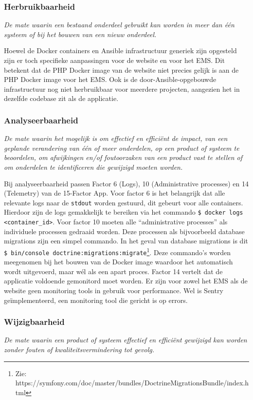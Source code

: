 \subsubsection{Herbruikbaarheid}
\textit{De mate waarin een bestaand onderdeel gebruikt kan worden in meer dan één systeem of bij het bouwen van een nieuw onderdeel.}

Hoewel de Docker containers en Ansible infrastructuur generiek zijn opgesteld zijn er toch specifieke aanpassingen voor de website en voor het EMS. Dit betekent dat de PHP Docker image van de website niet precies gelijk is aan de PHP Docker image voor het EMS. Ook is de door-Ansible-opgebouwde infrastructuur nog niet herbruikbaar voor meerdere projecten, aangezien het in dezelfde codebase zit als de applicatie.

\subsubsection{Analyseerbaarheid}
\textit{De mate waarin het mogelijk is om effectief en efficiënt de impact, van een geplande verandering van één of meer onderdelen, op een product of systeem te beoordelen, om afwijkingen en/of foutoorzaken van een product vast te stellen of om onderdelen te identificeren die gewijzigd moeten worden.}

Bij analyseerbaarheid passen Factor 6 (Logs), 10 (Administrative processes) en 14 (Telemetry) van de 15-Factor App. Voor factor 6 is het belangrijk dat alle relevante logs naar de \texttt{stdout} worden gestuurd, dit gebeurt voor alle containers. Hierdoor zijn de logs gemakkelijk te bereiken via het commando \texttt{\$ docker logs <container\_id>}. Voor factor 10 moeten alle \enquote{administrative processes} als individuele processen gedraaid worden. Deze processen als bijvoorbeeld database migrations zijn een simpel commando. In het geval van database migrations is dit \texttt{\$ bin/console doctrine:migrations:migrate}\footnote{Zie: https://symfony.com/doc/master/bundles/DoctrineMigrationsBundle/index.html}. Deze commando's worden meegenomen bij het bouwen van de Docker image waardoor het automatisch wordt uitgevoerd, maar wél als een apart proces. Factor 14 vertelt dat de applicatie voldoende gemonitord moet worden. Er zijn voor zowel het EMS als de website geen monitoring tools in gebruik voor performance. Wel is Sentry geïmplementeerd, een monitoring tool die gericht is op errors.

\subsubsection{Wijzigbaarheid}
\textit{De mate waarin een product of systeem effectief en efficiënt gewijzigd kan worden zonder fouten of kwaliteitsvermindering tot gevolg.}

